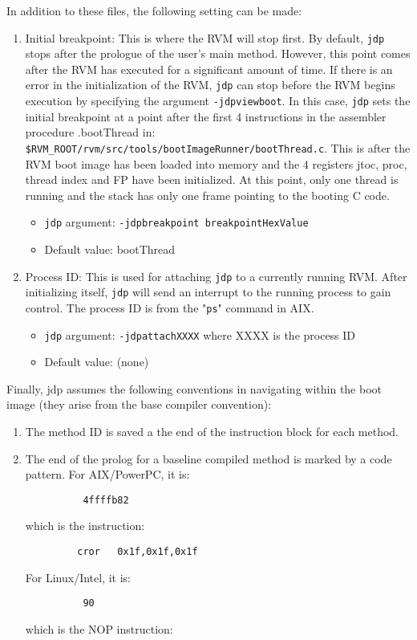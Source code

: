 In addition to these files, the following setting can be made:

\begin{enumerate}
\item Initial breakpoint:  
   This is where the RVM will stop first.  By default, {\tt jdp} stops
   after the prologue of the user's main method.  However, this point
   comes after the RVM has executed for a significant amount of time.
   If there is an error in the initialization of the RVM, {\tt jdp} can stop
   before the RVM begins execution by specifying the argument {\tt -jdpviewboot}.
   In this case, {\tt jdp} sets the initial breakpoint at a point after the
   first 4 instructions in the assembler procedure .bootThread in:
        {\tt \$RVM\_ROOT/rvm/src/tools/bootImageRunner/bootThread.c}.
   This is after the RVM boot image has been loaded into memory and
   the 4 registers jtoc, proc, thread index and FP have been initialized.
   At this point, only one thread is running and the stack has only 
   one frame pointing to the booting C code.
\begin{itemize}
\item   {\tt jdp} argument:     {\tt -jdpbreakpoint breakpointHexValue}
\item    Default value:         bootThread
\end{itemize}

\item Process ID:
   This is used for attaching {\tt jdp} to a currently running RVM.  After 
   initializing itself, {\tt jdp} will send an interrupt to the running process 
   to gain control.  The process ID is from the "{\tt ps}" command in AIX\AIXTMFootnote.
\begin{itemize}
\item   {\tt jdp} argument:     {\tt -jdpattachXXXX} where XXXX is the process ID
\item    Default value:         (none)
\end{itemize}
\end{enumerate}


Finally, jdp assumes the following conventions in navigating within the 
boot image (they arise from the base compiler convention):

\begin{enumerate}
\item The method ID is saved a the end of the instruction block for each
   method.

\item The end of the prolog for a baseline compiled method is marked by a code pattern.
For AIX/PowerPC\PowerPCTMFootnote, it is:
\begin{verbatim}
          4ffffb82      
\end{verbatim}
   which is the instruction:

\begin{verbatim}
         cror   0x1f,0x1f,0x1f
\end{verbatim}
For Linux/Intel, it is:
\begin{verbatim}
          90
\end{verbatim}
   which is the NOP instruction:
\end{enumerate}


